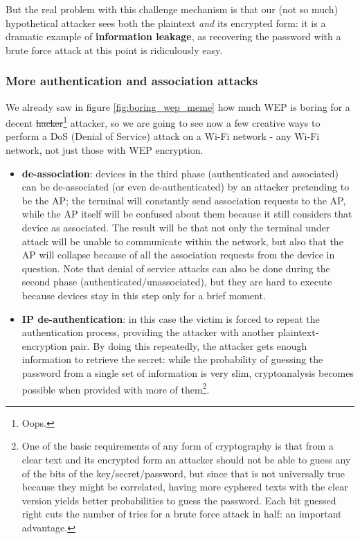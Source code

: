 But the real problem with this challenge mechanism is that our (not so much) hypothetical attacker sees both the plaintext \textit{and} its encrypted form: it is a dramatic example of \textbf{information leakage}, as recovering the password with a brute force attack at this point is ridiculously easy.


\subsubsection*{More authentication and association attacks}
We already saw in figure \ref{fig:boring_wep_meme} how much WEP is boring for a decent \sout{hacker}\footnote{Oops.} attacker, so we are going to see now a few creative ways to perform a DoS (Denial of Service) attack on a Wi-Fi network - any Wi-Fi network, not just those with WEP encryption.

\begin{itemize}
    \item \textbf{de-association}: devices in the third phase (authenticated and associated) can be de-associated (or even de-authenticated) by an attacker pretending to be the AP; the terminal will constantly send association requests to the AP, while the AP itself will be confused about them because it still considers that device as associated. The result will be that not only the terminal under attack will be unable to communicate within the network, but also that the AP will collapse because of all the association requests from the device in question. Note that denial of service attacks can also be done during the second phase (authenticated/unassociated), but they are hard to execute because devices stay in this step only for a brief moment.
    \item \textbf{IP de-authentication}: in this case the victim is forced to repeat the authentication process, providing the attacker with another plaintext-encryption pair. By doing this repeatedly, the attacker gets enough information to retrieve the secret: while the probability of guessing the password from a single set of information is very slim, cryptoanalysis becomes possible when provided with more of them\footnote{One of the basic requirements of any form of cryptography is that from a clear text and its encrypted form an attacker should not be able to guess any of the bits of the key/secret/password, but since that is not universally true because they might be correlated, having more cyphered texts with the clear version yields better probabilities to guess the password. Each bit guessed right cuts the number of tries for a brute force attack in half: an important advantage.}.
\end{itemize}

